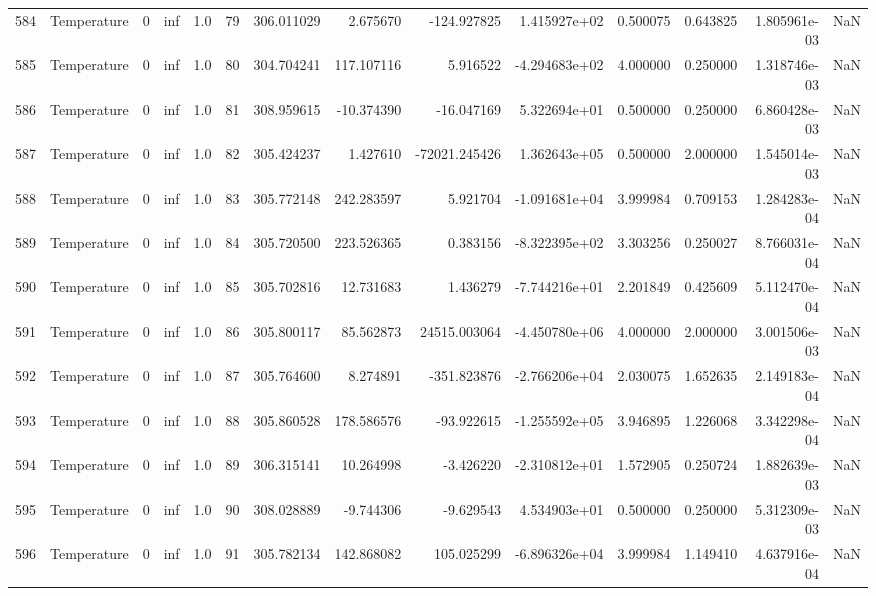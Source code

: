 \begin{tabular}{llrrrrrrrrrrrr}
584 &  Temperature &       0 &  inf &  1.0 &   79 &  306.011029 &     2.675670 &    -124.927825 &  1.415927e+02 &  0.500075 &  0.643825 &  1.805961e-03 &      NaN \\
585 &  Temperature &       0 &  inf &  1.0 &   80 &  304.704241 &   117.107116 &       5.916522 & -4.294683e+02 &  4.000000 &  0.250000 &  1.318746e-03 &      NaN \\
586 &  Temperature &       0 &  inf &  1.0 &   81 &  308.959615 &   -10.374390 &     -16.047169 &  5.322694e+01 &  0.500000 &  0.250000 &  6.860428e-03 &      NaN \\
587 &  Temperature &       0 &  inf &  1.0 &   82 &  305.424237 &     1.427610 &  -72021.245426 &  1.362643e+05 &  0.500000 &  2.000000 &  1.545014e-03 &      NaN \\
588 &  Temperature &       0 &  inf &  1.0 &   83 &  305.772148 &   242.283597 &       5.921704 & -1.091681e+04 &  3.999984 &  0.709153 &  1.284283e-04 &      NaN \\
589 &  Temperature &       0 &  inf &  1.0 &   84 &  305.720500 &   223.526365 &       0.383156 & -8.322395e+02 &  3.303256 &  0.250027 &  8.766031e-04 &      NaN \\
590 &  Temperature &       0 &  inf &  1.0 &   85 &  305.702816 &    12.731683 &       1.436279 & -7.744216e+01 &  2.201849 &  0.425609 &  5.112470e-04 &      NaN \\
591 &  Temperature &       0 &  inf &  1.0 &   86 &  305.800117 &    85.562873 &   24515.003064 & -4.450780e+06 &  4.000000 &  2.000000 &  3.001506e-03 &      NaN \\
592 &  Temperature &       0 &  inf &  1.0 &   87 &  305.764600 &     8.274891 &    -351.823876 & -2.766206e+04 &  2.030075 &  1.652635 &  2.149183e-04 &      NaN \\
593 &  Temperature &       0 &  inf &  1.0 &   88 &  305.860528 &   178.586576 &     -93.922615 & -1.255592e+05 &  3.946895 &  1.226068 &  3.342298e-04 &      NaN \\
594 &  Temperature &       0 &  inf &  1.0 &   89 &  306.315141 &    10.264998 &      -3.426220 & -2.310812e+01 &  1.572905 &  0.250724 &  1.882639e-03 &      NaN \\
595 &  Temperature &       0 &  inf &  1.0 &   90 &  308.028889 &    -9.744306 &      -9.629543 &  4.534903e+01 &  0.500000 &  0.250000 &  5.312309e-03 &      NaN \\
596 &  Temperature &       0 &  inf &  1.0 &   91 &  305.782134 &   142.868082 &     105.025299 & -6.896326e+04 &  3.999984 &  1.149410 &  4.637916e-04 &      NaN \\

\end{tabular}
